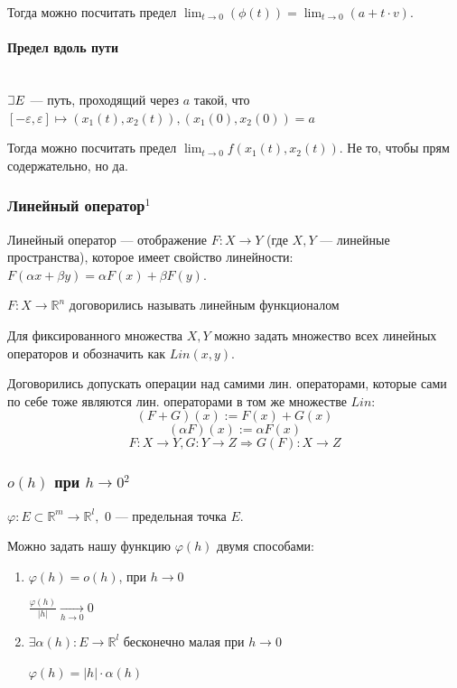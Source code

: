\documentclass{article}
\def\letus{%
\mathord{\setbox0=\hbox{$\exists$}%
         \hbox{\kern 0.125\wd0%
               \vbox to \ht0{%
                  \hrule width 0.75\wd0%
                  \vfill%
                  \hrule width 0.75\wd0}%
               \vrule height \ht0%
               \kern 0.125\wd0}%
       }%
        }
\let\vanillaparagraph\paragraph
\renewcommand{\paragraph}[1]{\vanillaparagraph{#1}\mbox{}\\}
\begin{document}
Тогда можно посчитать предел $\lim_{t\rightarrow 0}(\phi(t)) = \lim_{t\rightarrow 0}(a + t \cdot v)$. 

\paragraph{Предел вдоль пути}
$\letus E$ --- путь, проходящий через $a$ такой, что $[-\varepsilon, \varepsilon] \mapsto (x_1(t), x_2(t)), (x_1(0), x_2(0)) = a$

Тогда можно посчитать предел $\lim_{t\rightarrow 0} f(x_1(t), x_2(t))$. Не то, чтобы прям содержательно, но да.

\subsubsection{Линейный оператор\texorpdfstring{$^1$}{}}
Линейный оператор --- отображение $F: X \rightarrow Y$ (где $X, Y$ --- линейные пространства), которое имеет свойство линейности: $F(\alpha x + \beta y) = \alpha F(x) + \beta F(y)$.


$F: X \rightarrow \mathbb{R}^n$ договорились называть линейным функционалом

Для фиксированного множества $X, Y$ можно задать множество всех линейных операторов и обозначить как $Lin(x, y)$.

Договорились допускать операции над самими лин. операторами, которые сами по себе тоже являются лин. операторами в том же множестве $Lin$:
$$(F + G)(x) := F(x) + G(x)$$
$$(\alpha F)(x) := \alpha F(x)$$
$$F: X \rightarrow Y, G: Y \rightarrow Z \Rightarrow G(F): X \rightarrow Z$$


\subsubsection{\texorpdfstring{$o(h)$}{o(h)} при \texorpdfstring{$h \rightarrow 0$}{h -> 0}\texorpdfstring{$^2$}{}}

$\varphi : E \subset \mathbb{R}^m \rightarrow \mathbb{R}^l, $ 0 --- предельная точка $E$.

Можно задать нашу функцию $\varphi(h)$ двумя способами:
\begin{enumerate}
    \item $ \varphi(h)=o(h)$, при $ h \rightarrow 0 $
    
$ \frac{\varphi(h)}{|h|} \underset{h \rightarrow 0}{\longrightarrow} 0 $

    \item $ \exists \alpha(h) : E \rightarrow \mathbb{R}^l $ бесконечно малая при $ h \rightarrow 0 $
    
    $ \varphi(h)=|h| \cdot \alpha(h) $
\end{enumerate}
\end{document}
